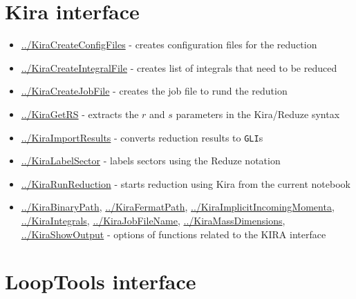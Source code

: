 \documentclass[../FeynHelpersManual.tex]{subfiles}
\begin{document}
\hypertarget{kira interface}{
\section{Kira interface}\label{kira interface}}

\begin{itemize}
\tightlist
\item
  \hyperlink{../kiracreateconfigfiles}{../KiraCreateConfigFiles} -
  creates configuration files for the reduction
\item
  \hyperlink{../kiracreateintegralfile}{../KiraCreateIntegralFile} -
  creates list of integrals that need to be reduced
\item
  \hyperlink{../kiracreatejobfile}{../KiraCreateJobFile} - creates the
  job file to rund the redution
\item
  \hyperlink{../kiragetrs}{../KiraGetRS} - extracts the \(r\) and \(s\)
  parameters in the Kira/Reduze syntax
\item
  \hyperlink{../kiraimportresults}{../KiraImportResults} - converts
  reduction results to \texttt{GLI}s
\item
  \hyperlink{../kiralabelsector}{../KiraLabelSector} - labels sectors
  using the Reduze notation
\item
  \hyperlink{../kirarunreduction}{../KiraRunReduction} - starts
  reduction using Kira from the current notebook
\item
  \hyperlink{../kirabinarypath}{../KiraBinaryPath},
  \hyperlink{../kirafermatpath}{../KiraFermatPath},
  \hyperlink{../kiraimplicitincomingmomenta}{../KiraImplicitIncomingMomenta},
  \hyperlink{../kiraintegrals}{../KiraIntegrals},
  \hyperlink{../kirajobfilename}{../KiraJobFileName},
  \hyperlink{../kiramassdimensions}{../KiraMassDimensions},
  \hyperlink{../kirashowoutput}{../KiraShowOutput} - options of
  functions related to the KIRA interface
\end{itemize}

\hypertarget{looptools interface}{
\section{LoopTools interface}\label{looptools interface}}
\end{document}

